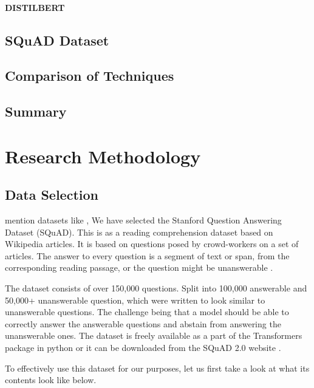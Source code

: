 \documentclass[a4paper,12pt]{report}
\begin{document}
	       \subsubsection{DISTILBERT}\label{2324}
	       \cite{distil}
        \section{SQuAD Dataset}\label{24}
        \section{Comparison of Techniques}\label{25}
        \section{Summary}\label{26}
        \citep{RAM}

    \chapter{\centering Research Methodology}\label{c3researchmeth}

    \section{Data Selection}\label{c31}

    mention datasets like \cite{lstmInsuranceQA},
    	We have selected the Stanford Question Answering Dataset (SQuAD). This is as a reading comprehension dataset based on Wikipedia articles. It is based on questions posed by crowd-workers on a set of articles. The answer to every question is a segment of text or span, from the corresponding reading passage, or the question might be unanswerable \citep{dataset}.

    	The dataset consists of over 150,000 questions. Split into 100,000 answerable and 50,000+ unanswerable question, which were written to look similar to unanswerable questions. The challenge being that a model should be able to correctly answer the answerable questions and abstain from answering the unanswerable ones.
	    The dataset is freely available as a part of the Transformers package in python or it can be downloaded from the SQuAD 2.0 website \citep{squad}.

	    To effectively use this dataset for our purposes, let us first take a look at what its contents look like below.\\ \\
	    \noindent{}
	    \\ \\
\end{document}
